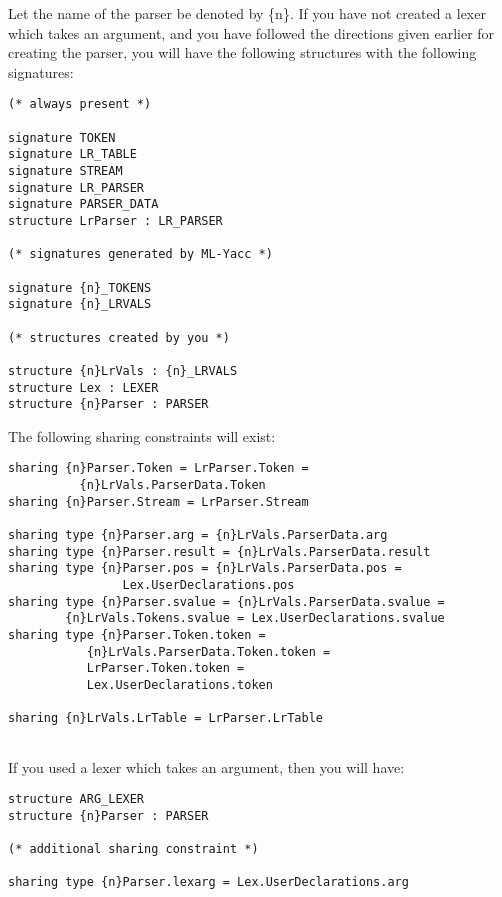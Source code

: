 \documentclass{article}
\begin{document}
Let the name of the parser be denoted by \{n\}.  If
you have not created a lexer which takes an argument, and
you have followed the directions given earlier for creating the parser, you
will have the following structures with the following signatures:
\begin{tt}
\begin{verbatim}
(* always present *)

signature TOKEN
signature LR_TABLE
signature STREAM
signature LR_PARSER
signature PARSER_DATA
structure LrParser : LR_PARSER

(* signatures generated by ML-Yacc *)

signature {n}_TOKENS
signature {n}_LRVALS

(* structures created by you *)

structure {n}LrVals : {n}_LRVALS
structure Lex : LEXER
structure {n}Parser : PARSER
\end{verbatim}
\end{tt}

The following sharing constraints will exist:
\begin{tt}
\begin{verbatim}
sharing {n}Parser.Token = LrParser.Token =
          {n}LrVals.ParserData.Token
sharing {n}Parser.Stream = LrParser.Stream

sharing type {n}Parser.arg = {n}LrVals.ParserData.arg
sharing type {n}Parser.result = {n}LrVals.ParserData.result
sharing type {n}Parser.pos = {n}LrVals.ParserData.pos =
                Lex.UserDeclarations.pos
sharing type {n}Parser.svalue = {n}LrVals.ParserData.svalue =
        {n}LrVals.Tokens.svalue = Lex.UserDeclarations.svalue
sharing type {n}Parser.Token.token =
           {n}LrVals.ParserData.Token.token =
           LrParser.Token.token =
           Lex.UserDeclarations.token

sharing {n}LrVals.LrTable = LrParser.LrTable
        
\end{verbatim}
\end{tt}

If you used a lexer which takes an argument, then you will
have:
\begin{tt}
\begin{verbatim}
structure ARG_LEXER
structure {n}Parser : PARSER

(* additional sharing constraint *)

sharing type {n}Parser.lexarg = Lex.UserDeclarations.arg
\end{verbatim}
\end{tt}
\end{document}

